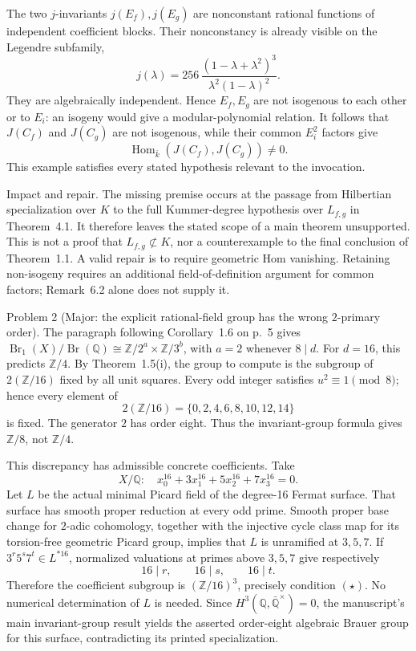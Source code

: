 \documentclass[10pt]{article}
\begin{document}
The two \(j\)-invariants \(j(E_f),j(E_g)\) are nonconstant rational functions of independent coefficient blocks. Their nonconstancy is already visible on the Legendre subfamily, \[j(\lambda)=256\,\frac{(1-\lambda+\lambda^2)^3}
                         {\lambda^2(1-\lambda)^2}.\] They are algebraically independent. Hence \(E_f,E_g\) are not isogenous to each other or to \(E_i\): an isogeny would give a modular-polynomial relation. It follows that \(J(C_f)\) and \(J(C_g)\) are not isogenous, while their common \(E_i^2\) factors give \[\mathop{\mathrm{Hom}}_{\bar k}(J(C_f),J(C_g))\ne0.\] This example satisfies every stated hypothesis relevant to the invocation.\par
Impact and repair. The missing premise occurs at the passage from Hilbertian specialization over \(K\) to the full Kummer-degree hypothesis over \(L_{f,g}\) in Theorem 4.1. It therefore leaves the stated scope of a main theorem unsupported. This is not a proof that \(L_{f,g}\not\subset K\), nor a counterexample to the final conclusion of Theorem 1.1. A valid repair is to require geometric Hom vanishing. Retaining non-isogeny requires an additional field-of-definition argument for common factors; Remark 6.2 alone does not supply it.\par
Problem 2 (Major: the explicit rational-field group has the wrong \(2\)-primary order).  The paragraph following Corollary 1.6 on p. 5 gives \(\mathop{\mathrm{Br}}_1(X)/\mathop{\mathrm{Br}}(\mathbb{Q})\cong\mathbb{Z}/2^a\times\mathbb{Z}/3^b\), with \(a=2\) whenever \(8\mid d\). For \(d=16\), this predicts \(\mathbb{Z}/4\). By Theorem 1.5(i), the group to compute is the subgroup of \(2(\mathbb{Z}/16)\) fixed by all unit squares. Every odd integer satisfies \(u^2\equiv1\pmod8\); hence every element of \[2(\mathbb{Z}/16)=\{0,2,4,6,8,10,12,14\}\] is fixed. The generator \(2\) has order eight. Thus the invariant-group formula gives \(\mathbb{Z}/8\), not \(\mathbb{Z}/4\).\par
This discrepancy has admissible concrete coefficients. Take \[X/\mathbb{Q}:\quad x_0^{16}+3x_1^{16}+5x_2^{16}+7x_3^{16}=0.\] Let \(L\) be the actual minimal Picard field of the degree-16 Fermat surface. That surface has smooth proper reduction at every odd prime. Smooth proper base change for \(2\)-adic cohomology, together with the injective cycle class map for its torsion-free geometric Picard group, implies that \(L\) is unramified at \(3,5,7\). If \(3^r5^s7^t\in L^{*16}\), normalized valuations at primes above \(3,5,7\) give respectively \[16\mid r,\qquad16\mid s,\qquad16\mid t.\] Therefore the coefficient subgroup is \((\mathbb{Z}/16)^3\), precisely condition \((\star)\). No numerical determination of \(L\) is needed. Since \(H^3(\mathbb{Q},\bar{\mathbb{Q}}^\times)=0\), the manuscript’s main invariant-group result yields the asserted order-eight algebraic Brauer group for this surface, contradicting its printed specialization.\par
\end{document}
